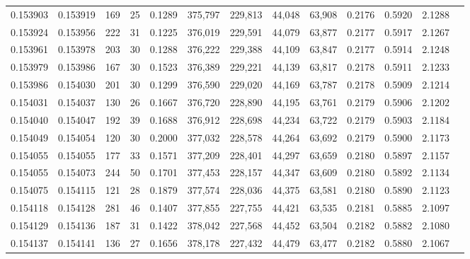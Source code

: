 \begin{tabular}{rrrrrrrrrrrrr}
0.153903 & 0.153919 &   169 &  25 &                                     0.1289 & 375,797 & 229,813 &  44,048 &  63,908 & 0.2176 & 0.5920 & 2.1288 \\
0.153924 & 0.153956 &   222 &  31 &                                     0.1225 & 376,019 & 229,591 &  44,079 &  63,877 & 0.2177 & 0.5917 & 2.1267 \\
0.153961 & 0.153978 &   203 &  30 &                                     0.1288 & 376,222 & 229,388 &  44,109 &  63,847 & 0.2177 & 0.5914 & 2.1248 \\
0.153979 & 0.153986 &   167 &  30 &                                     0.1523 & 376,389 & 229,221 &  44,139 &  63,817 & 0.2178 & 0.5911 & 2.1233 \\
0.153986 & 0.154030 &   201 &  30 &                                     0.1299 & 376,590 & 229,020 &  44,169 &  63,787 & 0.2178 & 0.5909 & 2.1214 \\
0.154031 & 0.154037 &   130 &  26 &                                     0.1667 & 376,720 & 228,890 &  44,195 &  63,761 & 0.2179 & 0.5906 & 2.1202 \\
0.154040 & 0.154047 &   192 &  39 &                                     0.1688 & 376,912 & 228,698 &  44,234 &  63,722 & 0.2179 & 0.5903 & 2.1184 \\
0.154049 & 0.154054 &   120 &  30 &                                     0.2000 & 377,032 & 228,578 &  44,264 &  63,692 & 0.2179 & 0.5900 & 2.1173 \\
0.154055 & 0.154055 &   177 &  33 &                                     0.1571 & 377,209 & 228,401 &  44,297 &  63,659 & 0.2180 & 0.5897 & 2.1157 \\
0.154055 & 0.154073 &   244 &  50 &                                     0.1701 & 377,453 & 228,157 &  44,347 &  63,609 & 0.2180 & 0.5892 & 2.1134 \\
0.154075 & 0.154115 &   121 &  28 &                                     0.1879 & 377,574 & 228,036 &  44,375 &  63,581 & 0.2180 & 0.5890 & 2.1123 \\
0.154118 & 0.154128 &   281 &  46 &                                     0.1407 & 377,855 & 227,755 &  44,421 &  63,535 & 0.2181 & 0.5885 & 2.1097 \\
0.154129 & 0.154136 &   187 &  31 &                                     0.1422 & 378,042 & 227,568 &  44,452 &  63,504 & 0.2182 & 0.5882 & 2.1080 \\
0.154137 & 0.154141 &   136 &  27 &                                     0.1656 & 378,178 & 227,432 &  44,479 &  63,477 & 0.2182 & 0.5880 & 2.1067 \\

\end{tabular}
